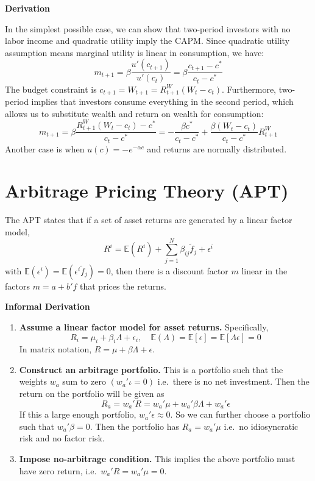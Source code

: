 \documentclass[
]{book}
\begin{document}
\textbf{Derivation}

In the simplest possible case, we can show that two-period investors with no labor income and quadratic utility imply the CAPM. Since quadratic utility assumption means marginal utility is linear in consumption, we have:
\[
m_{t+1}=\beta\frac{u'\left(c_{t+1}\right)}{u'\left(c_{t}\right)}=\beta\frac{c_{t+1}-c^{*}}{c_{t}-c^{*}}
\]
The budget constraint is \(c_{t+1}=W_{t+1}=R_{t+1}^{W}\left(W_{t}-c_{t}\right)\). Furthermore, two-period implies that investors consume everything in the second period, which allows us to substitute wealth and return on wealth for consumption:
\[
m_{t+1}=\beta\frac{R_{t+1}^{W}\left(W_{t}-c_{t}\right)-c^{*}}{c_{t}-c^{*}}=-\frac{\beta c^{*}}{c_{t}-c^{*}}+\frac{\beta\left(W_{t}-c_{t}\right)}{c_{t}-c^{*}}R_{t+1}^{W}
\]
Another case is when \(u\left(c\right)=-e^{-\alpha c}\) and returns are normally distributed.

\hypertarget{arbitrage-pricing-theory-apt}{%
\section{Arbitrage Pricing Theory (APT)}\label{arbitrage-pricing-theory-apt}}

The APT states that if a set of asset returns are generated by a linear factor model,
\[
R^{i}=\mathbb{E}\left(R^{i}\right)+\sum_{j=1}^{N}\beta_{ij}\tilde{f}_{j}+\epsilon^{i}
\]
with \(\mathbb{E}\left(\epsilon^{i}\right)=\mathbb{E}\left(\epsilon^{i}\tilde{f}_{j}\right)=0\), then there is a discount factor \(m\) linear in the factors \(m=a+b'f\) that prices the returns.

\textbf{Informal Derivation}

\begin{enumerate}
\def\labelenumi{\arabic{enumi}.}
\item
  \textbf{Assume a linear factor model for asset returns.} Specifically,
  \[
  R_{i}=\mu_{i}+\beta_{i}\Lambda+\epsilon_{i},\quad\mathbb{E}\left(\Lambda\right)=\mathbb{E}\left[\epsilon\right]=\mathbb{E}\left[\Lambda\epsilon\right]=0
  \]
  In matrix notation, \(R=\mu+\beta\Lambda+\epsilon\).
\item
  \textbf{Construct an arbitrage portfolio.} This is a portfolio such that the weights \(w_{a}\) sum to zero \(\left(w_{a}'\iota=0\right)\) i.e.~there is no net investment. Then the return on the portfolio will be given as
  \[
  R_{a}=w_{a}'R=w_{a}'\mu+w_{a}'\beta\Lambda+w_{a}'\epsilon
  \]
  If this a large enough portfolio, \(w_{a}'\epsilon\approx0.\) So we can further choose a portfolio such that \(w_{a}'\beta=0.\) Then the portfolio has \(R_{a}=w_{a}'\mu\) i.e.~no idiosyncratic risk and no factor risk.
\item
  \textbf{Impose no-arbitrage condition.} This implies the above portfolio must have zero return, i.e.~\(w_{a}'R=w_{a}'\mu=0\).
\end{enumerate}
\end{document}
